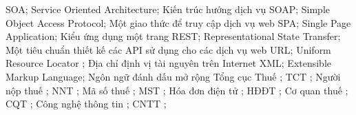 






SOA; Service Oriented Architecture; Kiến trúc hướng dịch vụ
SOAP; Simple Object Access Protocol; Một giao thức để truy cập dịch vụ web
SPA; Single Page Application; Kiểu ứng dụng một trang
REST; Representational State Transfer; Một tiêu chuẩn thiết kế các API sử dụng cho các dịch vụ web
URL; Uniform Resource Locator ; Địa chỉ định vị tài nguyên trên Internet
XML; Extensible Markup Language; Ngôn ngữ đánh dấu mở rộng
Tổng cục Thuế ; TCT ;
Người nộp thuế ; NNT ;
Mã số thuế ; MST ;
Hóa đơn điện tử ; HĐĐT ;
Cơ quan thuế ; CQT ;
Công nghệ thông tin ; CNTT ;

